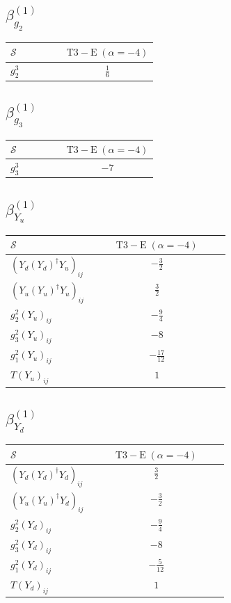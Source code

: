 \documentclass[9pt]{article}
\begin{document}
\subsection*{$ \beta_{g_2}^{(1)} $}
\begin{longtable}{@{}p{0.38\linewidth}c@{}}
\toprule
$\mathcal{S}$ & $ \mathrm{T3-E}\;(\alpha=-4) $ \\
\midrule
$ g_2^3 $ & $ \frac{1}{6} $ \\
\bottomrule
\end{longtable}
\subsection*{$ \beta_{g_3}^{(1)} $}
\begin{longtable}{@{}p{0.38\linewidth}c@{}}
\toprule
$\mathcal{S}$ & $ \mathrm{T3-E}\;(\alpha=-4) $ \\
\midrule
$ g_3^3 $ & $ -7 $ \\
\bottomrule
\end{longtable}
\subsection*{$ \beta_{Y_u}^{(1)} $}
\begin{longtable}{@{}p{0.38\linewidth}c@{}}
\toprule
$\mathcal{S}$ & $ \mathrm{T3-E}\;(\alpha=-4) $ \\
\midrule
$ (Y_d (Y_d)^{\dagger} Y_u)_{ij} $ & $ - \frac{3}{2} $ \\
$ (Y_u (Y_u)^{\dagger} Y_u)_{ij} $ & $ \frac{3}{2} $ \\
$ g_2^2 (Y_u)_{ij} $ & $ - \frac{9}{4} $ \\
$ g_3^2 (Y_u)_{ij} $ & $ -8 $ \\
$ g_1^2 (Y_u)_{ij} $ & $ - \frac{17}{12} $ \\
$ T (Y_u)_{ij} $ & $ 1 $ \\
\bottomrule
\end{longtable}
\subsection*{$ \beta_{Y_d}^{(1)} $}
\begin{longtable}{@{}p{0.38\linewidth}c@{}}
\toprule
$\mathcal{S}$ & $ \mathrm{T3-E}\;(\alpha=-4) $ \\
\midrule
$ (Y_d (Y_d)^{\dagger} Y_d)_{ij} $ & $ \frac{3}{2} $ \\
$ (Y_u (Y_u)^{\dagger} Y_d)_{ij} $ & $ - \frac{3}{2} $ \\
$ g_2^2 (Y_d)_{ij} $ & $ - \frac{9}{4} $ \\
$ g_3^2 (Y_d)_{ij} $ & $ -8 $ \\
$ g_1^2 (Y_d)_{ij} $ & $ - \frac{5}{12} $ \\
$ T (Y_d)_{ij} $ & $ 1 $ \\
\bottomrule
\end{longtable}
\end{document}
